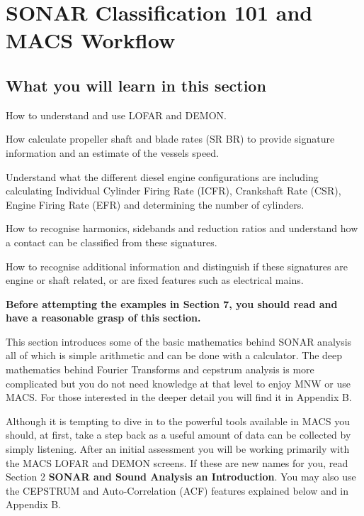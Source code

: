\section{SONAR Classification 101 and MACS Workflow}

\subsection{What you will learn in this section}

\begin{compactenum}
    \item How to understand and use LOFAR and DEMON.
    \item How calculate propeller shaft and blade rates (SR BR) to provide signature information and an estimate of the vessels speed.
    \item Understand what the different diesel engine configurations are including calculating Individual Cylinder Firing Rate (ICFR), Crankshaft Rate (CSR), Engine Firing Rate (EFR) and determining the number of cylinders.
    \item How to recognise harmonics, sidebands and reduction ratios and understand how a contact can be classified from these signatures.
    \item How to recognise additional information and distinguish if these signatures are engine or shaft related, or are fixed features such as electrical mains.
\end{compactenum}

\textbf{Before attempting the examples in Section 7, you should read and have a reasonable grasp of this section.}

\begin{faintquote}
    This section introduces some of the basic mathematics behind SONAR analysis all of which is simple arithmetic and can be done with a calculator. The deep mathematics behind Fourier Transforms and cepstrum analysis is more complicated but you do not need knowledge at that level to enjoy MNW or use MACS. For those interested in the deeper detail you will find it in Appendix B.
\end{faintquote}

Although it is tempting to dive in to the powerful tools available in MACS you should, at first, take a step back as a useful amount of data can be collected by simply listening. After an initial assessment you will be working primarily with the MACS LOFAR and DEMON screens. If these are new names for you, read Section 2 \textbf{SONAR and Sound Analysis an Introduction}. You may also use the CEPSTRUM and Auto-Correlation (ACF) features explained below and in Appendix B. 

